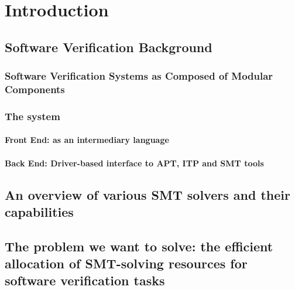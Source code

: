 
\chapter{Introduction} %
\thispagestyle{nohead}
\label{Intro} %


\newcommand{\keyword}[1]{\textbf{#1}}
\newcommand{\tabhead}[1]{\textbf{#1}}
\newcommand{\code}[1]{\texttt{#1}}
\newcommand{\file}[1]{\texttt{\bfseries#1}}
\newcommand{\option}[1]{\texttt{\itshape#1}}

\section{Software Verification Background}
\subsection{Software Verification Systems as Composed of Modular Components}
\subsection{The \why system}
\subsubsection{Front End: \why as an intermediary language}
\subsubsection{Back End: Driver-based interface to \textsc{APT}, \textsc{ITP} and \textsc{SMT} tools}
\section{An overview of various \textsc{SMT} solvers and their capabilities}
\section{The problem we want to solve: the efficient allocation of \textsc{SMT}-solving resources for software verification tasks}

